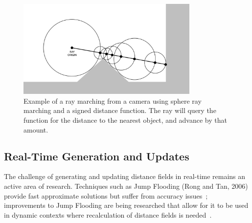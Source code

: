 \begin{figure}[thp]
    \caption{Example of a ray marching from a camera using sphere ray marching and a signed distance function. The ray
    will query the function for the distance to the nearest object, and advance by that amount.}
    \begin{center}
        \includegraphics[width=0.8\textwidth]{figures/ray_marching.png}
    \end{center}
\end{figure}

\subsection{Real-Time Generation and Updates}
The challenge of generating and updating distance fields in real-time remains an active area of research. Techniques
such as Jump Flooding (Rong and Tan, 2006) provide fast approximate solutions but suffer from accuracy
issues~\cite{rong2006jump,rong2007variants}; improvements to Jump Flooding are being researched that allow for it to
be used in dynamic contexts where recalculation of distance fields is needed~\cite{stevenson2022gpu}.
